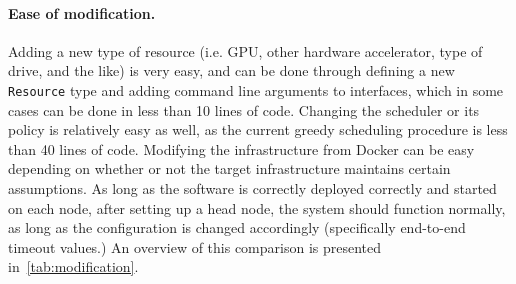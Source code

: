 \documentclass[sigconf]{acmart}
\begin{document}
\paragraph{Ease of modification.}
Adding a new type of resource (i.e. GPU, other hardware accelerator, type of drive, and the like) is very easy, and can be done 
through defining a new \verb|Resource| type and adding command line arguments to interfaces, which in some cases can be done in 
less than 10 lines of code. 
Changing the scheduler or its policy is relatively easy as well, as the current greedy scheduling procedure is less than 40
lines of code.
Modifying the infrastructure from Docker can be easy depending on whether or not the target infrastructure maintains certain
assumptions. As long as the software is correctly deployed correctly and started on each node, after setting up a head node,
the system should function normally, as long as the configuration is changed accordingly 
(specifically end-to-end timeout values.)
An overview of this comparison is presented in~\cref{tab:modification}.
\end{document}
